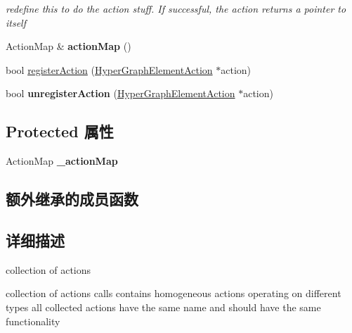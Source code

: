 \begin{DoxyCompactItemize}
\begin{DoxyCompactList}\small\item\em redefine this to do the action stuff. If successful, the action returns a pointer to itself \end{DoxyCompactList}\item 
\hypertarget{classg2o_1_1HyperGraphElementActionCollection_a26d57ddd0079ed7181fbb322c9a8106c}{Action\-Map \& {\bfseries action\-Map} ()}\label{classg2o_1_1HyperGraphElementActionCollection_a26d57ddd0079ed7181fbb322c9a8106c}

\item 
bool \hyperlink{classg2o_1_1HyperGraphElementActionCollection_a9eb641e9c9bb22f3540dc98c2c750ea9}{register\-Action} (\hyperlink{classg2o_1_1HyperGraphElementAction}{Hyper\-Graph\-Element\-Action} $\ast$action)
\item 
\hypertarget{classg2o_1_1HyperGraphElementActionCollection_a6dc646c0dd8fbf9b54fb8161348af5e6}{bool {\bfseries unregister\-Action} (\hyperlink{classg2o_1_1HyperGraphElementAction}{Hyper\-Graph\-Element\-Action} $\ast$action)}\label{classg2o_1_1HyperGraphElementActionCollection_a6dc646c0dd8fbf9b54fb8161348af5e6}

\end{DoxyCompactItemize}
\subsection*{Protected 属性}
\begin{DoxyCompactItemize}
\item 
\hypertarget{classg2o_1_1HyperGraphElementActionCollection_a637c13fca95eacab38ee82eedd3669e4}{Action\-Map {\bfseries \-\_\-action\-Map}}\label{classg2o_1_1HyperGraphElementActionCollection_a637c13fca95eacab38ee82eedd3669e4}

\end{DoxyCompactItemize}
\subsection*{额外继承的成员函数}


\subsection{详细描述}
collection of actions 

collection of actions calls contains homogeneous actions operating on different types all collected actions have the same name and should have the same functionality 

